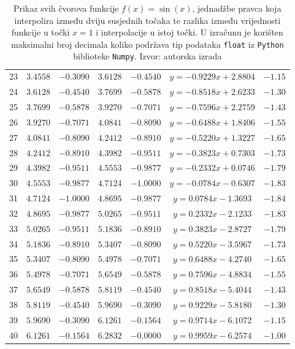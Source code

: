 \documentclass[12pt,a4paper]{report}
\begin{document}
\begin{table}
\begin{tabular}{c | c c | c c | c | c}
23 &$3.4558$&$-0.3090$&$3.6128$&$-0.4540$&$y = -0.9229x+2.8804$&$-1.15$\\
24 &$3.6128$&$-0.4540$&$3.7699$&$-0.5878$&$y = -0.8518x+2.6233$&$-1.30$\\
25 &$3.7699$&$-0.5878$&$3.9270$&$-0.7071$&$y = -0.7596x+2.2759$&$-1.43$\\
26 &$3.9270$&$-0.7071$&$4.0841$&$-0.8090$&$y = -0.6488x+1.8406$&$-1.55$\\
27 &$4.0841$&$-0.8090$&$4.2412$&$-0.8910$&$y = -0.5220x+1.3227$&$-1.65$\\
28 &$4.2412$&$-0.8910$&$4.3982$&$-0.9511$&$y = -0.3823x+0.7303$&$-1.73$\\
29 &$4.3982$&$-0.9511$&$4.5553$&$-0.9877$&$y = -0.2332x+0.0746$&$-1.79$\\
30 &$4.5553$&$-0.9877$&$4.7124$&$-1.0000$&$y = -0.0784x-0.6307$&$-1.83$\\
31 &$4.7124$&$-1.0000$&$4.8695$&$-0.9877$&$y =  0.0784x-1.3693$&$-1.84$\\
32 &$4.8695$&$-0.9877$&$5.0265$&$-0.9511$&$y =  0.2332x-2.1233$&$-1.83$\\
33 &$5.0265$&$-0.9511$&$5.1836$&$-0.8910$&$y =  0.3823x-2.8727$&$-1.79$\\
34 &$5.1836$&$-0.8910$&$5.3407$&$-0.8090$&$y =  0.5220x-3.5967$&$-1.73$\\
35 &$5.3407$&$-0.8090$&$5.4978$&$-0.7071$&$y =  0.6488x-4.2740$&$-1.65$\\
36 &$5.4978$&$-0.7071$&$5.6549$&$-0.5878$&$y =  0.7596x-4.8834$&$-1.55$\\
37 &$5.6549$&$-0.5878$&$5.8119$&$-0.4540$&$y =  0.8518x-5.4044$&$-1.43$\\
38 &$5.8119$&$-0.4540$&$5.9690$&$-0.3090$&$y =  0.9229x-5.8180$&$-1.30$\\
39 &$5.9690$&$-0.3090$&$6.1261$&$-0.1564$&$y =  0.9714x-6.1072$&$-1.15$\\
40 &$6.1261$&$-0.1564$&$6.2832$&$-0.0000$&$y =  0.9959x-6.2574$&$-1.00$\\


			
		\end{tabular}
		\caption{Prikaz svih čvorova funkcije $f(x)=\sin(x)$, jednadžbe pravca koja interpolira između dviju susjednih točaka te razlika između vrijednosti funkcije u točki $x=1$ i interpolacije u istoj točki. U izračunu je korišten maksimalni broj decimala koliko podržava tip podataka \texttt{float} iz \texttt{Python} biblioteke \texttt{Numpy}. Izvor: autorska izrada}
		\label{linInterpolTablica}
		\end{table}
\end{document}
